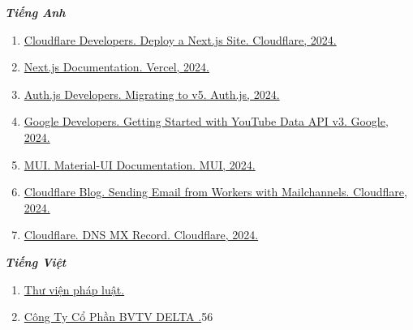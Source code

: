 \renewcommand{\labelenumi}{[\arabic{enumi}]}
\textbf{\textit{Tiếng Anh}}
\begin{enumerate}
    \item \href{https://developers.cloudflare.com/pages/framework-guides/nextjs/deploy-a-nextjs-site/}{Cloudflare Developers. Deploy a Next.js Site. Cloudflare, 2024.}
    \item \href{https://nextjs.org/docs}{Next.js Documentation. Vercel, 2024.}
    \item \href{https://authjs.dev/getting-started/migrating-to-v5}{Auth.js Developers. Migrating to v5. Auth.js, 2024.}
    \item \href{https://developers.google.com/youtube/v3/getting-started}{Google Developers. Getting Started with YouTube Data API v3. Google, 2024.}
    \item \href{https://mui.com/material-ui/getting-started/}{MUI. Material-UI Documentation. MUI, 2024.}
    \item \href{https://blog.cloudflare.com/sending-email-from-workers-with-mailchannels}{Cloudflare Blog. Sending Email from Workers with Mailchannels. Cloudflare, 2024.}
    \item \href{https://www.cloudflare.com/learning/dns/dns-records/dns-mx-record/}{Cloudflare. DNS MX Record. Cloudflare, 2024.}
\end{enumerate}

\textbf{\textit{Tiếng Việt}}
\begin{enumerate}
    \item \href{https://thuvienphapluat.vn/}{Thư viện pháp luật.}
    \item \href{https://congtydelta.com/}{Công Ty Cổ Phần BVTV DELTA .}56
\end{enumerate}